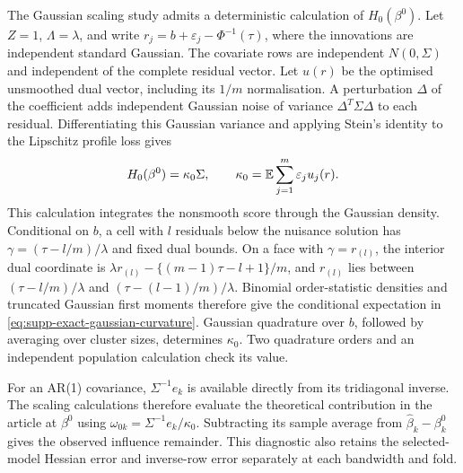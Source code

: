 The Gaussian scaling study admits a deterministic calculation of
$H_0(\beta^0)$. Let $Z=1$, $\Lambda=\lambda$, and write
$r_j=b+\varepsilon_j-\Phi^{-1}(\tau)$, where the innovations are
independent standard Gaussian. The covariate rows are independent
$N(0,\Sigma)$ and independent of the complete residual vector.
Let $u(r)$ be the optimised unsmoothed dual vector, including its
$1/m$ normalisation. A perturbation $\Delta$ of the coefficient adds
independent Gaussian noise of variance $\Delta^T\Sigma\Delta$ to
each residual. Differentiating this Gaussian variance and applying
Stein's identity to the Lipschitz profile loss gives
\begin{equation}\label{eq:supp-exact-gaussian-curvature}
 H_0(\beta^0)=\kappa_0\Sigma,\qquad
 \kappa_0=\mathbb{E}\sum_{j=1}^m\varepsilon_j u_j(r).
\end{equation}
This calculation integrates the nonsmooth score through the Gaussian
density. Conditional on $b$, a cell with $l$ residuals below the
nuisance solution has $\gamma=(\tau-l/m)/\lambda$ and fixed dual
bounds. On a face with $\gamma=r_{(l)}$, the interior dual coordinate
is $\lambda r_{(l)}-\{(m-1)\tau-l+1\}/m$, and
$r_{(l)}$ lies between $(\tau-l/m)/\lambda$ and
$(\tau-(l-1)/m)/\lambda$. Binomial order-statistic densities and
truncated Gaussian first moments therefore give the conditional
expectation in \eqref{eq:supp-exact-gaussian-curvature}. Gaussian
quadrature over $b$, followed by averaging over cluster sizes,
determines $\kappa_0$. Two quadrature orders and an independent
population calculation check its value.

For an AR(1) covariance, $\Sigma^{-1}e_k$ is available directly from
its tridiagonal inverse. The scaling calculations therefore evaluate
the theoretical contribution in the article at $\beta^0$ using
$\omega_{0k}=\Sigma^{-1}e_k/\kappa_0$. Subtracting its sample average
from $\widehat\beta_k-\beta_k^0$ gives the observed influence
remainder. This diagnostic also retains the selected-model Hessian
error and inverse-row error separately at each bandwidth and fold.
